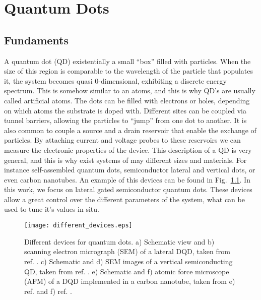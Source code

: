 
\chapter{Quantum Dots} %

\label{sec:Quantum_Dots} %


\section{Fundaments}

A quantum dot (QD) existentially a small ``box'' filled with particles. When the size of this region is comparable to the wavelength of the particle that populates it, the system becomes quasi 0-dimensional, exhibiting a discrete energy spectrum. This is somehow similar to an atoms, and this is why QD's are usually called artificial atoms. The dots can be filled with electrons or holes, depending on which atoms the substrate is doped with. Different sites can be coupled via tunnel barriers, allowing the particles to ``jump'' from one dot to another. It is also common to couple a source and a drain reservoir that enable the exchange of particles. By attaching current and voltage probes to these reservoirs we can measure the electronic properties of the device. This description of a QD is very general, and this is why exist systems of may different sizes and materials. For instance self-assembled quantum dots, semiconductor lateral and vertical dots, or even carbon nanotubes. An example of this devices can be found in Fig.~\ref{fig:different_devices}. In this work, we focus on lateral gated semiconductor quantum dots. These devices allow a great control over the different parameters of the system, what can be used to tune it's values in situ. 
\begin{figure}[!htb]
	\centering
	\texttt{[image: different\_devices.eps]}
	\caption{Different devices for quantum dots. a) Schematic view and b) scanning electron micrograph (SEM) of a lateral DQD, taken from ref. \cite{Hanson2007}. c) Schematic and d) SEM images of a vertical semiconducting QD, taken from ref. \cite{Kouwenhoven2001}. e) Schematic and f) atomic force microscope (AFM) of a DQD implemented in a carbon nanotube, taken from e) ref. \cite{SapmazPhd} and f) ref. \cite{Sapmaz2006}.}
	\label{fig:different_devices}
\end{figure}

